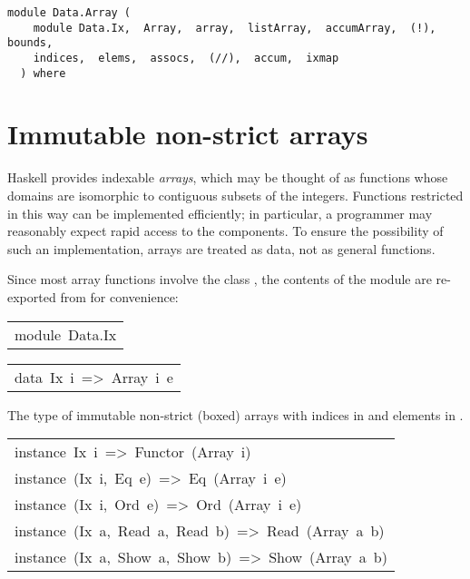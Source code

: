 \label{module:Data.Array}
\haddockbeginheader
{\haddockverb\begin{verbatim}
module Data.Array (
    module Data.Ix,  Array,  array,  listArray,  accumArray,  (!),  bounds, 
    indices,  elems,  assocs,  (//),  accum,  ixmap
  ) where\end{verbatim}}
\haddockendheader

\section{Immutable non-strict arrays
}
Haskell provides indexable \emph{arrays}, which may be thought of as functions
whose domains are isomorphic to contiguous subsets of the integers.
Functions restricted in this way can be implemented efficiently;
in particular, a programmer may reasonably expect rapid access to
the components.  To ensure the possibility of such an implementation,
arrays are treated as data, not as general functions.
\par
Since most array functions involve the class , the contents of the
module  are re-exported from  for convenience:
\par

\begin{haddockdesc}
\item[\begin{tabular}{@{}l}
module\ Data.Ix
\end{tabular}]
\end{haddockdesc}
\begin{haddockdesc}
\item[\begin{tabular}{@{}l}
data\ Ix\ i\ =>\ Array\ i\ e
\end{tabular}]\haddockbegindoc
The type of immutable non-strict (boxed) arrays
 with indices in  and elements in .
\par

\end{haddockdesc}
\begin{haddockdesc}
\item[\begin{tabular}{@{}l}
instance\ Ix\ i\ =>\ Functor\ (Array\ i)\\instance\ (Ix\ i,\ Eq\ e)\ =>\ Eq\ (Array\ i\ e)\\instance\ (Ix\ i,\ Ord\ e)\ =>\ Ord\ (Array\ i\ e)\\instance\ (Ix\ a,\ Read\ a,\ Read\ b)\ =>\ Read\ (Array\ a\ b)\\instance\ (Ix\ a,\ Show\ a,\ Show\ b)\ =>\ Show\ (Array\ a\ b)
\end{tabular}]
\end{haddockdesc}
